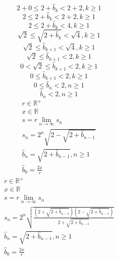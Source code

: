 \documentclass[a4paper,12pt]{report}
\begin{document}
\begin{equation}
2 + 0 \leq 2 + \hat{b}_k < 2 + 2, k \geq 1
\end{equation}
\begin{equation}
2 \leq 2 + \hat{b}_k < 2 + 2, k \geq 1
\end{equation}
\begin{equation}
2 \leq 2 + \hat{b}_k < 4, k \geq 1
\end{equation}
\begin{equation}
\sqrt{2} \leq \sqrt{2 + \hat{b}_k} < \sqrt{4}, k \geq 1
\end{equation}
\begin{equation}
\sqrt{2} \leq \hat{b}_{k+1} < \sqrt{4}, k \geq 1
\end{equation}
\begin{equation}
\sqrt{2} \leq \hat{b}_{k+1} < 2, k \geq 1
\end{equation}
\begin{equation}
0 < \sqrt{2} \leq \hat{b}_{k+1} < 2, k \geq 1
\end{equation}
\begin{equation}
0 \leq \hat{b}_{k+1} < 2, k \geq 1
\end{equation}
\begin{equation}
0 \leq \hat{b}_n < 2, n \geq 1
\end{equation}
\begin{equation}
\hat{b}_n < 2, n \geq 1
\end{equation}
\begin{subequations}
\begin{gather}
r \in \mathbb{R}^+ \\
x \in \mathbb{R} \\
s = r \lim \limits_{n \to \infty} s_n \\
s_n = 2^n \sqrt{2 - \sqrt{2 + \hat{b}_{n-1}}} \\
\hat{b}_n = \sqrt{2 + \hat{b}_{n-1}}, n \geq 1 \\
\hat{b}_0 = \frac{2x}{r}
\end{gather}
\end{subequations}
\begin{subequations}
\begin{gather}
r \in \mathbb{R}^+ \\
x \in \mathbb{R} \\
s = r \lim \limits_{n \to \infty} s_n \\
s_n = 2^n \sqrt{\frac{\left(2 + \sqrt{2 + \hat{b}_{n-1}}\right) \left(2 - \sqrt{2 + \hat{b}_{n-1}}\right)}{2 + \sqrt{2 + \hat{b}_{n-1}}}} \\
\hat{b}_n = \sqrt{2 + \hat{b}_{n-1}}, n \geq 1 \\
\hat{b}_0 = \frac{2x}{r}
\end{gather}
\end{subequations}
\end{document}

